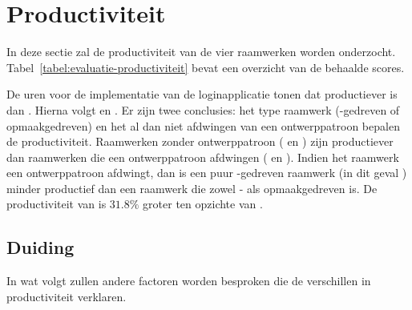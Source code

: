 \section{Productiviteit}
\label{sec:evaluatie-productiviteit}

In deze sectie zal de productiviteit van de vier raamwerken worden onderzocht.
Tabel~\ref{tabel:evaluatie-productiviteit} bevat een overzicht van de behaalde scores.

\begin{table}
\centering
{}
\caption{Overzicht van productiviteit voor \st{}~(\sta), \kendo{}~(\kendoa), \jqm{}~(\jqma) en \lungo{}~(\lungoa).}
\label{tabel:evaluatie-productiviteit}
\end{table}

De uren voor de implementatie van de loginapplicatie tonen dat \jqm{} productiever is dan \lungo{}. 
Hierna volgt \kendo{} en \st{}.
Er zijn twee conclusies: het type raamwerk (\js-gedreven of opmaakgedreven) en het al dan niet afdwingen van een ontwerppatroon bepalen de productiviteit.
Raamwerken zonder ontwerppatroon (\jqm{} en \lungo{}) zijn productiever dan raamwerken die een ontwerppatroon afdwingen (\st{} en \kendo{}).
Indien het raamwerk een ontwerppatroon afdwingt, dan is een puur \js{}-gedreven raamwerk (in dit geval \st{}) minder productief dan een raamwerk die zowel \js{}- als opmaakgedreven is.
De productiviteit van \kendo{} is $31.8\%$ groter ten opzichte van \st{}.

\subsection{Duiding}
In wat volgt zullen andere factoren worden besproken die de verschillen in productiviteit verklaren.

